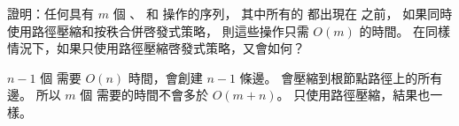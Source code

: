 \startEXERCISE\DIFFICULT
證明：任何具有 $m$ 個 、  和  操作的序列，
其中所有的  都出現在  之前，
如果同時使用路徑壓縮和按秩合併啓發式策略，
則這些操作只需 $O(m)$ 的時間。
在同樣情況下，如果只使用路徑壓縮啓發式策略，又會如何？
\stopEXERCISE

\startANSWER
$n-1$ 個  需要 $O(n)$ 時間，會創建 $n-1$ 條邊。
  會壓縮到根節點路徑上的所有邊。
所以 $m$ 個  需要的時間不會多於 $O(m+n)$。
只使用路徑壓縮，結果也一樣。
\stopANSWER
